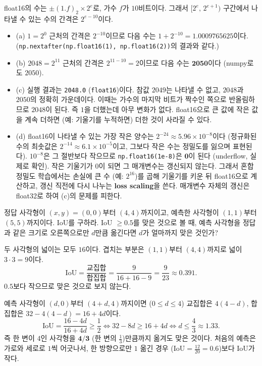 \documentclass[11pt,a4paper]{article}
\begin{document}
\begin{problems}
\begin{sol}
float16의 수는 $\pm(1.f)_2\times2^{e}$로, 가수 $f$가 $10$비트이다. 그래서 $[2^e,\,2^{e+1})$ 구간에서 나타낼 수 있는 수의 간격은 $2^{e-10}$이다.
\begin{itemize}[leftmargin=1.5em,itemsep=2pt]
\item (a) $1=2^0$ 근처의 간격은 $2^{-10}$이므로 다음 수는 $1+2^{-10}=\mathbf{1.0009765625}$이다.
(\texttt{np.nextafter(np.float16(1), np.float16(2))}의 결과와 같다.)
\item (b) $2048=2^{11}$ 근처의 간격은 $2^{11-10}=2$이므로 다음 수는 $\mathbf{2050}$이다 (numpy로도 $2050$).
\item (c) 실행 결과는 \texttt{2048.0} (\texttt{float16})이다.
참값 $2049$는 나타낼 수 없고, $2048$과 $2050$의 정확히 가운데이다. 이때는 가수의 마지막 비트가 짝수인 쪽으로 반올림하므로 $2048$이 된다.
즉 $1$을 더했는데 아무 변화가 없다. float16으로 큰 값에 작은 값을 계속 더하면 (예: 기울기를 누적하면) 더한 것이 사라질 수 있다.
\item (d) float16이 나타낼 수 있는 가장 작은 양수는 $2^{-24}\approx5.96\times10^{-8}$이다 (정규화된 수의 최솟값은 $2^{-14}\approx6.1\times10^{-5}$이고, 그보다 작은 수는 정밀도를 잃으며 표현된다).
$10^{-8}$은 그 절반보다 작으므로 \texttt{np.float16(1e-8)}은 $\mathbf{0}$이 된다 (underflow, 실제로 확인).
작은 기울기가 $0$이 되면 그 매개변수는 갱신되지 않는다.
그래서 혼합 정밀도 학습에서는 손실에 큰 수 (예: $2^{16}$)를 곱해 기울기를 키운 뒤 float16으로 계산하고, 갱신 직전에 다시 나누는 \textbf{loss scaling}을 쓴다.
매개변수 자체의 갱신은 float32로 하여 (c)의 문제를 피한다.
\end{itemize}
\end{sol}

\item 정답 사각형이 $(x,y)=(0,0)$부터 $(4,4)$까지이고, 예측한 사각형이 $(1,1)$부터 $(5,5)$까지이다. IoU를 구하라.
IoU $\ge0.5$를 맞은 것으로 볼 때, 예측 사각형을 정답과 같은 크기로 오른쪽으로만 $d$만큼 옮긴다면 $d$가 얼마까지 맞은 것인가?

\begin{sol}
두 사각형의 넓이는 모두 $16$이다. 겹치는 부분은 $(1,1)$부터 $(4,4)$까지로 넓이 $3\cdot3=9$이다.
\[
\text{IoU}=\frac{\text{교집합}}{\text{합집합}}=\frac{9}{16+16-9}=\frac{9}{23}\approx\mathbf{0.391}.
\]
$0.5$보다 작으므로 맞은 것으로 보지 않는다.

예측 사각형이 $(d,0)$부터 $(4+d,4)$까지이면 ($0\le d\le4$) 교집합은 $4(4-d)$, 합집합은 $32-4(4-d)=16+4d$이다.
\[
\text{IoU}=\frac{16-4d}{16+4d}\ge\frac12
\iff 32-8d\ge16+4d
\iff d\le\frac43\approx1.33 .
\]
즉 한 변이 $4$인 사각형을 $\mathbf{4/3}$ (한 변의 $\frac13$)만큼까지 옮겨도 맞은 것이다.
처음의 예측은 가로와 세로로 $1$씩 어긋나서, 한 방향으로만 $1$ 옮긴 경우 ($\text{IoU}=\frac{12}{20}=0.6$)보다 IoU가 작다.
\end{sol}


\end{problems}
\end{document}
